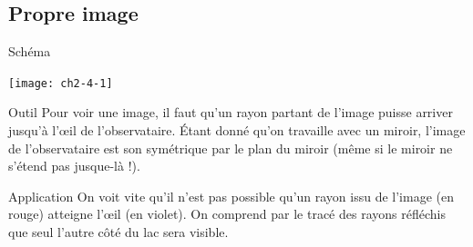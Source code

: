 \documentclass[../main/main.tex]{subfiles}
\begin{document}
\subsection{Propre image}
\begin{tcbraster}[raster columns=2, raster equal height=rows]
    \begin{NCdefi}{Schéma}
        \begin{center}
            \texttt{[image: ch2-4-1]}
        \end{center}
    \end{NCdefi}
    \begin{tcolorbox}[blankest, raster multicolumn=1, space to=\myspace]
        \begin{tcbraster}[raster columns=1]
            \begin{NCdemo}{Outil}
                Pour voir une image, il faut qu'un rayon partant de l'image
                puisse arriver jusqu'à l'œil de l'observataire. Étant donné
                qu'on travaille avec un miroir, l'image de l'observataire est
                son symétrique par le plan du miroir (même si le miroir ne
                s'étend pas jusque-là !).
            \end{NCdemo}
            \begin{NCexem}{Application}
                On voit vite qu'il n'est pas possible qu'un rayon issu de
                l'image (en rouge) atteigne l'œil (en violet). On comprend par
                le tracé des rayons réfléchis que seul l'autre côté du lac sera
                visible.
            \end{NCexem}
        \end{tcbraster}
    \end{tcolorbox}
\end{tcbraster}
\end{document}
